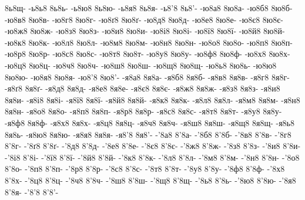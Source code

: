 {8ь8щ-
-ь8ь8
8ь8ь-
-ь8ю8
8ь8ю-
-ь8я8
8ь8я-
-ь8'8
8ь8'-
-ю8а8
8ю8а-
-ю8б8
8ю8б-
-ю8в8
8ю8в-
-ю8г8
8ю8г-
-ю8ґ8
8ю8ґ-
-ю8д8
8ю8д-
-ю8е8
8ю8е-
-ю8є8
8ю8є-
-ю8ж8
8ю8ж-
-ю8з8
8ю8з-
-ю8и8
8ю8и-
-ю8і8
8ю8і-
-ю8ї8
8ю8ї-
-ю8й8
8ю8й-
-ю8к8
8ю8к-
-ю8л8
8ю8л-
-ю8м8
8ю8м-
-ю8н8
8ю8н-
-ю8о8
8ю8о-
-ю8п8
8ю8п-
-ю8р8
8ю8р-
-ю8с8
8ю8с-
-ю8т8
8ю8т-
-ю8у8
8ю8у-
-ю8ф8
8ю8ф-
-ю8х8
8ю8х-
-ю8ц8
8ю8ц-
-ю8ч8
8ю8ч-
-ю8ш8
8ю8ш-
-ю8щ8
8ю8щ-
-ю8ь8
8ю8ь-
-ю8ю8
8ю8ю-
-ю8я8
8ю8я-
-ю8'8
8ю8'-
-я8а8
8я8а-
-я8б8
8я8б-
-я8в8
8я8в-
-я8г8
8я8г-
-я8ґ8
8я8ґ-
-я8д8
8я8д-
-я8е8
8я8е-
-я8є8
8я8є-
-я8ж8
8я8ж-
-я8з8
8я8з-
-я8и8
8я8и-
-я8і8
8я8і-
-я8ї8
8я8ї-
-я8й8
8я8й-
-я8к8
8я8к-
-я8л8
8я8л-
-я8м8
8я8м-
-я8н8
8я8н-
-я8о8
8я8о-
-я8п8
8я8п-
-я8р8
8я8р-
-я8с8
8я8с-
-я8т8
8я8т-
-я8у8
8я8у-
-я8ф8
8я8ф-
-я8х8
8я8х-
-я8ц8
8я8ц-
-я8ч8
8я8ч-
-я8ш8
8я8ш-
-я8щ8
8я8щ-
-я8ь8
8я8ь-
-я8ю8
8я8ю-
-я8я8
8я8я-
-я8'8
8я8'-
-'8а8
8'8а-
-'8б8
8'8б-
-'8в8
8'8в-
-'8г8
8'8г-
-'8ґ8
8'8ґ-
-'8д8
8'8д-
-'8е8
8'8е-
-'8є8
8'8є-
-'8ж8
8'8ж-
-'8з8
8'8з-
-'8и8
8'8и-
-'8і8
8'8і-
-'8ї8
8'8ї-
-'8й8
8'8й-
-'8к8
8'8к-
-'8л8
8'8л-
-'8м8
8'8м-
-'8н8
8'8н-
-'8о8
8'8о-
-'8п8
8'8п-
-'8р8
8'8р-
-'8с8
8'8с-
-'8т8
8'8т-
-'8у8
8'8у-
-'8ф8
8'8ф-
-'8х8
8'8х-
-'8ц8
8'8ц-
-'8ч8
8'8ч-
-'8ш8
8'8ш-
-'8щ8
8'8щ-
-'8ь8
8'8ь-
-'8ю8
8'8ю-
-'8я8
8'8я-
-'8'8
8'8'-
}
